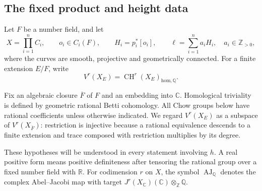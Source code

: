 \documentclass[11pt,a4paper]{article}
\theoremstyle{definition}
\newtheorem{definition}[theorem]{Definition}
\newcommand{\Q}{\mathbb Q}\newcommand{\R}{\mathbb R}\newcommand{\C}{\mathbb C}
\newcommand{\Z}{\mathbb Z}\newcommand{\A}{\mathbb A}\newcommand{\Fbar}{\overline F}
\newcommand{\CH}{\operatorname{CH}}\newcommand{\Pic}{\operatorname{Pic}}
\newcommand{\AJ}{\operatorname{AJ}}\newcommand{\Tr}{\operatorname{Tr}}
\newcommand{\homol}{\mathrm{hom}}\newcommand{\alg}{\mathrm{alg}}
\numberwithin{equation}{section}
\begin{document}
\subsection{The fixed product and height data}\label{sec:height-data}

Let \(F\) be a number field, and let
\[
 X=\prod_{i=1}^n C_i,\qquad
 o_i\in C_i(F),\qquad H_i=p_i^*[o_i],\qquad
 \ell=\sum_{i=1}^n a_iH_i,\quad a_i\in\Z_{>0},
\]
where the curves are smooth, projective and geometrically
connected. For a finite extension \(E/F\), write
\[
 V^r(X_E)=\CH^r(X_E)_{\homol,\Q}.
\]

Fix an algebraic closure \(\Fbar\) of \(F\) and an embedding into
\(\C\). Homological triviality is defined by geometric rational
Betti cohomology. All Chow groups below have rational coefficients
unless otherwise indicated. We regard \(V^r(X_E)\) as a subspace
of \(V^r(X_{\Fbar})\): restriction is injective because a rational
equivalence descends to a finite extension and trace composed with
restriction multiplies by its degree.


These hypotheses will be understood in every statement involving
\(h\). A real positive form means positive definiteness after
tensoring the rational group over a fixed number field with \(\R\).
For codimension \(r\) on \(X\), the symbol \(\AJ_\Q\)
denotes the complex Abel--Jacobi map with target
\(J^r(X_\C)(\C)\otimes_\Z\Q\).
\end{document}
